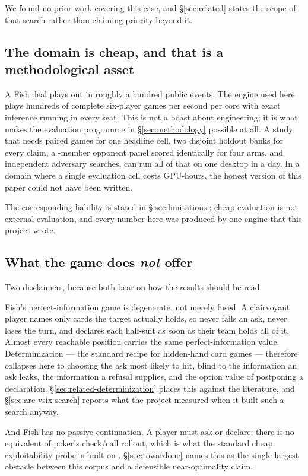 We found no prior work covering this case, and \S\ref{sec:related} states the scope of that search
rather than claiming priority beyond it.

\subsection{The domain is cheap, and that is a methodological asset}
\label{sec:domain-cheap}

A Fish deal plays out in roughly a hundred public events. The engine used here plays hundreds of
complete six-player games per second per core with exact inference running in every seat. This is
not a boast about engineering; it is what makes the evaluation programme in \S\ref{sec:methodology}
possible at all. A study that needs \vsevenBtwoFcheapN{} paired games for one headline cell, two disjoint holdout
banks for every claim, a \vsevenPanelMembers{}-member opponent panel scored identically for four
arms, and \vsevenBfourArms{} independent adversary searches, can run all of that on one desktop in a
day. In a domain
where a single evaluation cell costs GPU-hours, the honest version of this paper could not have been
written.

The corresponding liability is stated in \S\ref{sec:limitations}: cheap evaluation is not external
evaluation, and every number here was produced by one engine that this project wrote.

\subsection{What the game does \emph{not} offer}
\label{sec:domain-not}

Two disclaimers, because both bear on how the results should be read.

Fish's perfect-information game is degenerate, not merely fused. A clairvoyant player names only
cards the target actually holds, so never fails an ask, never loses the turn, and declares each
half-suit as soon as their team holds all of it. Almost every reachable position carries the same
perfect-information value. Determinization --- the standard recipe for hidden-hand card games
\cite{levy,ginsberg-gib} --- therefore collapses here to choosing the ask most likely to hit, blind
to the information an ask leaks, the information a refusal supplies, and the option value of
postponing a declaration. \S\ref{sec:related-determinization} places this against the literature,
and \S\ref{sec:arc-vsix-search} reports what the project measured when it built such a search
anyway.

And Fish has no passive continuation. A player must ask or declare; there is no equivalent of poker's
check/call rollout, which is what the standard cheap exploitability probe is built on
\cite{lisy2017lbr}. \S\ref{sec:towardone} names this as the single largest obstacle between this
corpus and a defensible near-optimality claim.
